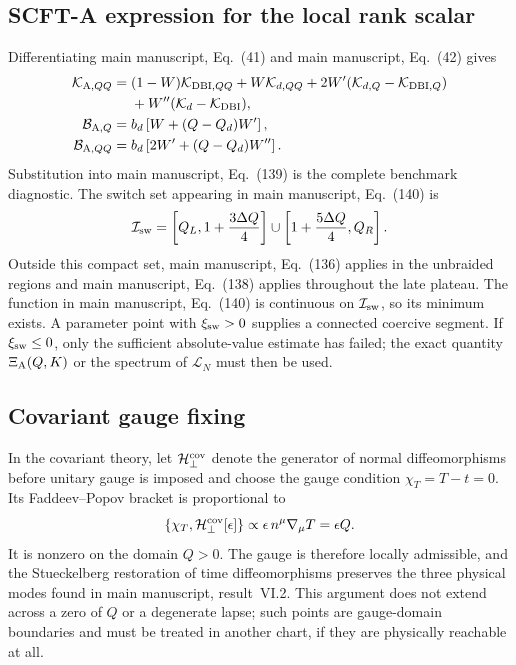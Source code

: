 \documentclass[aps,prd,reprint,onecolumn,notitlepage,nofootinbib,longbibliography,floatfix]{revtex4-2}
\theoremstyle{scstyle}
\theoremstyle{definition}
\theoremstyle{remark}
\newcommand{\cK}{\mathcal K}
\newcommand{\cB}{\mathcal B}
\begin{document}
\subsection{SCFT-A expression for the local rank scalar}
\label{app:XiA}

Differentiating main manuscript, Eq.~(41) and main manuscript, Eq.~(42) gives
\begin{align}
\cK_{{\rm A},QQ}
={}&(1-W)\cK_{{\rm DBI},QQ}+W\cK_{d,QQ}
+2W'(\cK_{d,Q}-\cK_{{\rm DBI},Q})\nonumber\\
&+W''(\cK_d-\cK_{\rm DBI}),
\label{eq:KAsecond}\\
\cB_{{\rm A},Q}
={}&b_d\left[W+(Q-Q_d)W'\right],
\label{eq:BAfirst}\\
\cB_{{\rm A},QQ}
={}&b_d\left[2W'+(Q-Q_d)W''\right].
\label{eq:BAsecond}
\end{align}
Substitution into main manuscript, Eq.~(139) is the complete benchmark diagnostic. The switch set appearing in main manuscript, Eq.~(140) is
\begin{equation}
\mathcal I_{\rm sw}
=\left[Q_L,1+\frac{3\Delta Q}{4}\right]
\cup
\left[1+\frac{5\Delta Q}{4},Q_R\right].
\label{eq:switchset}
\end{equation}
Outside this compact set, main manuscript, Eq.~(136) applies in the unbraided regions and main manuscript, Eq.~(138) applies throughout the late plateau. The function in main manuscript, Eq.~(140) is continuous on $\mathcal I_{\rm sw}$, so its minimum exists. A parameter point with $\xi_{\rm sw}>0$ supplies a connected coercive segment. If $\xi_{\rm sw}\le0$, only the sufficient absolute-value estimate has failed; the exact quantity $\Xi_{\rm A}(Q,K)$ or the spectrum of $\mathscr L_N$ must then be used.

\subsection{Covariant gauge fixing}

In the covariant theory, let $\mathcal H_\perp^{\rm cov}$ denote the generator of normal diffeomorphisms before unitary gauge is imposed and choose the gauge condition $\chi_T=T-t=0$. Its Faddeev--Popov bracket is proportional to
\begin{equation}
\{\chi_T,\mathcal H_\perp^{\rm cov}[\epsilon]\}
\propto\epsilon\,n^\mu\nabla_\mu T
=\epsilon Q.
\label{eq:FPclock}
\end{equation}
It is nonzero on the domain $Q>0$. The gauge is therefore locally admissible, and the Stueckelberg restoration of time diffeomorphisms preserves the three physical modes found in main manuscript, result~VI.2. This argument does not extend across a zero of $Q$ or a degenerate lapse; such points are gauge-domain boundaries and must be treated in another chart, if they are physically reachable at all.
\end{document}
